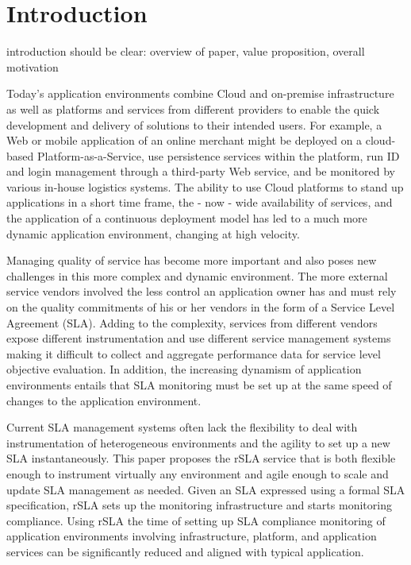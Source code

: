 \section{Introduction}\label{sec:introduction}


introduction should be clear: overview of paper, 
value proposition, overall motivation


Today's application environments combine Cloud and on-premise infrastructure as well as platforms and services from different providers to enable the quick development and 
delivery of solutions to their intended users. For example, a Web or mobile application of an online merchant might be deployed on a cloud-based Platform-as-a-Service, use 
persistence services within the platform, run ID and login management through a third-party Web service, and be monitored by various in-house logistics systems. The ability to use 
Cloud platforms to stand up applications in a short time frame, the - now - wide availability of services, and the application of a continuous deployment model has led to a much 
more dynamic application environment, changing at high velocity.

Managing quality of service has become more important and also poses new challenges in this more complex and dynamic environment. The more external service vendors involved the 
less control an application owner has and must rely on the quality commitments of his or her vendors in the form of a Service Level Agreement (SLA). Adding to the complexity, 
services from different vendors expose different instrumentation and use different service management systems making it difficult to collect and aggregate performance data for 
service level objective evaluation. In addition, the increasing dynamism of application environments entails that SLA monitoring must be set up at the same speed of changes to the 
application environment.  

Current SLA management systems often lack the flexibility to deal with instrumentation of heterogeneous environments and the agility to set up a new SLA instantaneously. This 
paper proposes the rSLA service that is both flexible enough to instrument virtually any environment and agile enough to scale and update SLA management as needed. Given an SLA 
expressed using a formal SLA specification, rSLA sets up the monitoring infrastructure and starts monitoring compliance. Using rSLA the time of setting up SLA compliance monitoring 
of application environments involving infrastructure, platform, and application services can be significantly reduced and aligned with typical application.




